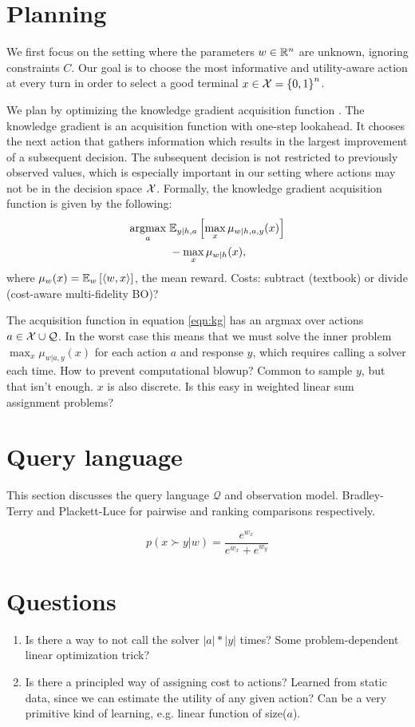 \documentclass[11pt]{article}
\begin{document}
\section{Planning}
We first focus on the setting where the parameters $w\in\mathbb{R}^n$ are unknown, ignoring constraints $C$.
Our goal is to choose the most informative and utility-aware action at every turn in order to select a good terminal $x\in\mathcal{X} = \left\{0,1\right\}^n$.

We plan by optimizing the knowledge gradient acquisition function \citep{kg}.
The knowledge gradient is an acquisition function with one-step lookahead.
It chooses the next action that gathers information which results in the largest improvement of a subsequent decision.
The subsequent decision is not restricted to previously observed values,
which is especially important in our setting where actions may not be in the decision space $\mathcal{X}$.
Formally, the knowledge gradient acquisition function is given by the following:
\begin{equation}
\label{eqn:kg}
\begin{aligned}
\operatorname*{argmax}_a \; & \mathbb{E}_{y|h,a}\left[\max_x \mu_{w|h,a,y}(x)\right]\\
&- \max_{x} \mu_{w|h}(x),
\end{aligned}
\end{equation}
where $\mu_w(x) = \mathbb{E}_{w}\left[\langle w,x \rangle\right]$, the mean reward.
Costs: subtract (textbook) or divide (cost-aware multi-fidelity BO)?

The acquisition function in equation \ref{eqn:kg} has an argmax over actions $a \in \mathcal{X} \cup \mathcal{Q}$.
In the worst case this means that we must solve the inner problem
$\max_x \mu_{w|a,y}(x)$ for each action $a$ and response $y$,
which requires calling a solver each time.
How to prevent computational blowup?
Common to sample $y$, but that isn't enough.
$x$ is also discrete. Is this easy in weighted linear sum assignment problems?

\section{Query language}
This section discusses the query language $\mathcal{Q}$ and observation model.
Bradley-Terry and Plackett-Luce for pairwise and ranking comparisons respectively.

\begin{equation}
p(x \succ y | w)= \frac{e^{w_x}}{e^{w_x} + e^{w_y}}
\end{equation}

\section{Questions}
\begin{enumerate}
    \item Is there a way to not call the solver $|a|*|y|$ times? Some problem-dependent linear optimization trick?
    \item Is there a principled way of assigning cost to actions? Learned from static data, since we can estimate the utility of any given action? Can be a very primitive kind of learning, e.g. linear function of size($a$).
\end{enumerate}
\end{document}
